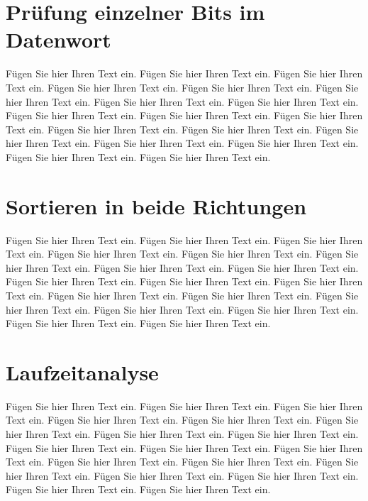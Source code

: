 \documentclass[12pt]{article}
\begin{document}
\section{Prüfung einzelner Bits im Datenwort}

Fügen Sie hier Ihren Text ein. Fügen Sie hier Ihren Text ein. Fügen
Sie hier Ihren Text ein. Fügen Sie hier Ihren Text ein. Fügen Sie hier
Ihren Text ein. Fügen Sie hier Ihren Text ein. Fügen Sie hier Ihren
Text ein. Fügen Sie hier Ihren Text ein. Fügen Sie hier Ihren Text
ein. Fügen Sie hier Ihren Text ein. Fügen Sie hier Ihren Text
ein. Fügen Sie hier Ihren Text ein. Fügen Sie hier Ihren Text
ein. Fügen Sie hier Ihren Text ein. Fügen Sie hier Ihren Text
ein. Fügen Sie hier Ihren Text ein. Fügen Sie hier Ihren Text
ein. Fügen Sie hier Ihren Text ein.

\section{Sortieren in beide Richtungen}

Fügen Sie hier Ihren Text ein. Fügen Sie hier Ihren Text ein. Fügen
Sie hier Ihren Text ein. Fügen Sie hier Ihren Text ein. Fügen Sie hier
Ihren Text ein. Fügen Sie hier Ihren Text ein. Fügen Sie hier Ihren
Text ein. Fügen Sie hier Ihren Text ein. Fügen Sie hier Ihren Text
ein. Fügen Sie hier Ihren Text ein. Fügen Sie hier Ihren Text
ein. Fügen Sie hier Ihren Text ein. Fügen Sie hier Ihren Text
ein. Fügen Sie hier Ihren Text ein. Fügen Sie hier Ihren Text
ein. Fügen Sie hier Ihren Text ein. Fügen Sie hier Ihren Text
ein. Fügen Sie hier Ihren Text ein.

\section{Laufzeitanalyse}

Fügen Sie hier Ihren Text ein. Fügen Sie hier Ihren Text ein. Fügen
Sie hier Ihren Text ein. Fügen Sie hier Ihren Text ein. Fügen Sie hier
Ihren Text ein. Fügen Sie hier Ihren Text ein. Fügen Sie hier Ihren
Text ein. Fügen Sie hier Ihren Text ein. Fügen Sie hier Ihren Text
ein. Fügen Sie hier Ihren Text ein. Fügen Sie hier Ihren Text
ein. Fügen Sie hier Ihren Text ein. Fügen Sie hier Ihren Text
ein. Fügen Sie hier Ihren Text ein. Fügen Sie hier Ihren Text
ein. Fügen Sie hier Ihren Text ein. Fügen Sie hier Ihren Text
ein. Fügen Sie hier Ihren Text ein.
\end{document}
